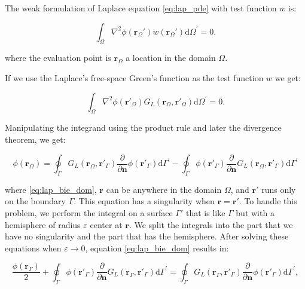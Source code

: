 The weak formulation of Laplace equation \eqref{eq:lap_pde} with test function $w$ is:

\begin{equation} \label{eq:lap_weak}
\int_\Omega \nabla^2 \phi(\mathbf{r}_\Omega') w(\mathbf{r}_\Omega') \text{d} \Omega^\prime= 0.
\end{equation}

where the evaluation point is $\mathbf{r}_\Omega$ a location in the domain $\Omega$.

If we use the Laplace's free-space Green's function as the test function $w$ we
get:

\begin{equation} \label{eq:lap_weak2}
\int_\Omega \nabla^2 \phi(\mathbf{r}'_\Omega) G_L(\mathbf{r}_\Omega,\mathbf{r}'_\Omega) \text{d} \Omega^\prime= 0.
\end{equation}

Manipulating the integrand using the product rule and later the divergence 
theorem, we get:

\begin{equation} \label{eq:lap_bie_dom}
\phi(\mathbf{r}_\Omega) = \oint_\Gamma G_L(\mathbf{r}_\Omega,\mathbf{r}'_\Gamma)  \frac{\partial} {\partial \mathbf{n}} \phi(\mathbf{r}'_\Gamma)  \text{d} \Gamma^\prime - \oint_\Gamma \phi(\mathbf{r}'_\Gamma)  \frac{\partial}{\partial \mathbf{n}} G_L(\mathbf{r}_\Omega,\mathbf{r}'_\Gamma) \text{d} \Gamma^\prime
\end{equation}

where \eqref{eq:lap_bie_dom}, $\mathbf{r}$ can be anywhere in the domain $\Omega$, 
and $\mathbf{r}'$ runs only on the boundary $\Gamma$. This equation has a 
singularity when $\mathbf{r}=\mathbf{r}'$. To handle this problem, we perform the
integral on a surface $\Gamma'$ that is like $\Gamma$ but with a hemisphere of 
radius $\varepsilon$ center at $\mathbf{r}$. We split the integrals into the part
that we have no singularity and the part that has the hemisphere. After solving these
equations when $\varepsilon \to 0$, equation \eqref{eq:lap_bie_dom} results in:

\begin{equation} \label{eq:lap_bie}
\frac{\phi(\mathbf{r}_\Gamma)}{2} +  \oint_\Gamma \phi(\mathbf{r}'_\Gamma)  \frac{\partial}{\partial \mathbf{n}} G_L(\mathbf{r}_\Gamma,\mathbf{r}'_\Gamma) \text{d} \Gamma^\prime = \oint_\Gamma G_L(\mathbf{r}_\Gamma,\mathbf{r}'_\Gamma)  \frac{\partial} {\partial \mathbf{n}} \phi(\mathbf{r}'_\Gamma)  \text{d} \Gamma^\prime,
\end{equation}

